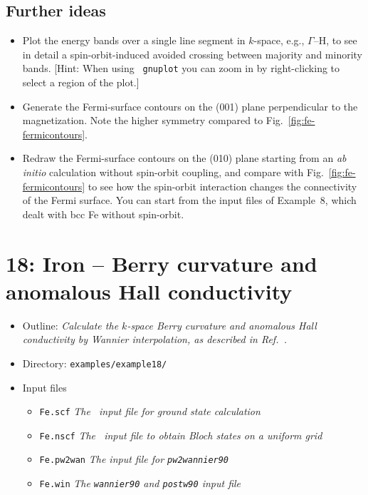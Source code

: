 \documentclass[a4paper,11pt,twoside]{article}
\begin{document}
\subsection*{Further ideas}

\begin{itemize}

\item Plot the energy bands over a single line segment in $k$-space,
  e.g., $\Gamma$--H, to see in detail a spin-orbit-induced avoided
  crossing between majority and minority bands. [Hint: When using {\tt
    gnuplot} you can zoom in by right-clicking to select a region of
  the plot.]

\item Generate the Fermi-surface contours on the (001) plane
perpendicular to the magnetization. Note the higher symmetry compared
to Fig.~\ref{fig:fe-fermicontours}.

\item Redraw the Fermi-surface contours on the (010) plane starting
  from an {\it ab initio} calculation without spin-orbit coupling, and
  compare with Fig.~\ref{fig:fe-fermicontours} to see how the
  spin-orbit interaction changes the connectivity of the Fermi
  surface.  You can start from the input files of Example~8, which
  dealt with bcc Fe without spin-orbit.

\end{itemize}

\cleardoublepage

\section*{18: Iron -- Berry curvature and anomalous Hall 
conductivity}

\begin{itemize}
\item{Outline: \it{Calculate the $k$-space Berry curvature and
      anomalous Hall conductivity by Wannier interpolation, as
      described in Ref.~\cite{wang-prb06}.}}
\item{Directory: {\tt examples/example18/}}
\item{Input files}
\begin{itemize}
\item{ {\tt Fe.scf} {\it The \pwscf\ input file for ground state
    calculation}}
\item{ {\tt Fe.nscf}  {\it The \pwscf\ input file to obtain Bloch
    states on a uniform grid}} 
\item{ {\tt Fe.pw2wan}  {\it The input file for {\tt pw2wannier90}}}
\item{ {\tt Fe.win}  {\it The {\tt wannier90} and {\tt postw90} input file}}
\end{itemize}
\end{itemize}
\end{document}

